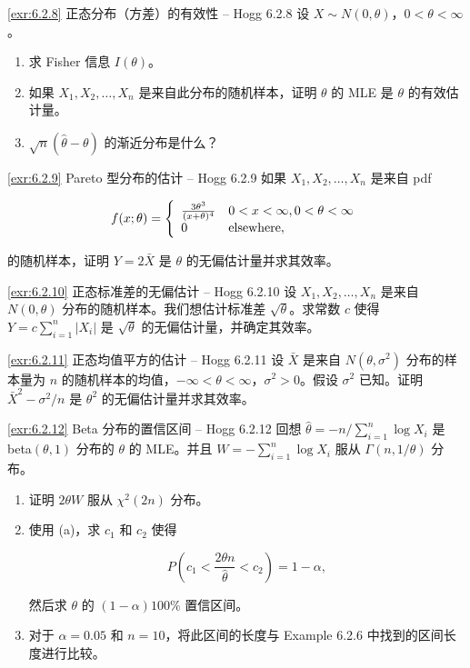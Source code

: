 \begin{exercise}{\ref{exr:6.2.8} 正态分布（方差）的有效性 – Hogg 6.2.8}\label{exr:6.2.8}
设 $X \sim N(0,\theta)$，$0 < \theta < \infty$。

\begin{enumerate}
\item[(a)] 求 Fisher 信息 $I(\theta)$。
\item[(b)] 如果 $X_1, X_2, \ldots, X_n$ 是来自此分布的随机样本，证明 $\theta$ 的 MLE 是 $\theta$ 的有效估计量。
\item[(c)] $\sqrt{n}(\widehat{\theta}-\theta)$ 的渐近分布是什么？
\end{enumerate}
\end{exercise}

\begin{exercise}{\ref{exr:6.2.9} Pareto 型分布的估计 – Hogg 6.2.9}\label{exr:6.2.9}
如果 $X_1, X_2, \ldots, X_n$ 是来自 pdf

\[
f(x;\theta) = \left\{ \begin{array}{l l}
\frac{3\theta^3}{(x+\theta)^4} & 0 < x < \infty, 0 < \theta < \infty \\
0 & \text{elsewhere},
\end{array} \right.
\]

的随机样本，证明 $Y = 2\bar{X}$ 是 $\theta$ 的无偏估计量并求其效率。
\end{exercise}

\begin{exercise}{\ref{exr:6.2.10} 正态标准差的无偏估计 – Hogg 6.2.10}\label{exr:6.2.10}
设 $X_1, X_2, \ldots, X_n$ 是来自 $N(0,\theta)$ 分布的随机样本。我们想估计标准差 $\sqrt{\theta}$。求常数 $c$ 使得 $Y = c\sum_{i=1}^n |X_i|$ 是 $\sqrt{\theta}$ 的无偏估计量，并确定其效率。
\end{exercise}

\begin{exercise}{\ref{exr:6.2.11} 正态均值平方的估计 – Hogg 6.2.11}\label{exr:6.2.11}
设 $\bar{X}$ 是来自 $N(\theta, \sigma^2)$ 分布的样本量为 $n$ 的随机样本的均值，$-\infty < \theta < \infty$，$\sigma^2 > 0$。假设 $\sigma^2$ 已知。证明 $\bar{X}^2 - \sigma^2/n$ 是 $\theta^2$ 的无偏估计量并求其效率。
\end{exercise}

\begin{exercise}{\ref{exr:6.2.12} Beta 分布的置信区间 – Hogg 6.2.12}\label{exr:6.2.12}
回想 $\widehat{\theta} = -n/\sum_{i=1}^n \log X_i$ 是 beta$(\theta,1)$ 分布的 $\theta$ 的 MLE。并且 $W = -\sum_{i=1}^n \log X_i$ 服从 $\Gamma(n, 1/\theta)$ 分布。

\begin{enumerate}
\item[(a)] 证明 $2\theta W$ 服从 $\chi^2(2n)$ 分布。
\item[(b)] 使用 (a)，求 $c_1$ 和 $c_2$ 使得

\[
P\left(c_1 < \frac{2\theta n}{\widehat{\theta}} < c_2\right) = 1-\alpha,
\]

然后求 $\theta$ 的 $(1-\alpha)100\%$ 置信区间。
\item[(c)] 对于 $\alpha = 0.05$ 和 $n=10$，将此区间的长度与 Example 6.2.6 中找到的区间长度进行比较。
\end{enumerate}
\end{exercise}

